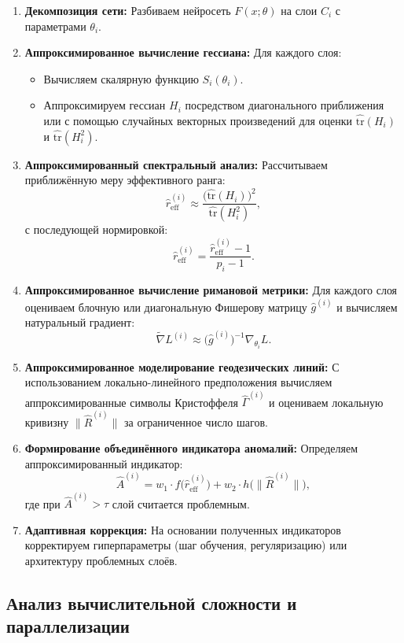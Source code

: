 \documentclass[a4paper,12pt]{article}
\begin{document}
\begin{enumerate}
    \item \textbf{Декомпозиция сети:} Разбиваем нейросеть \( F(x;\theta) \) на слои \( C_i \) с параметрами \(\theta_i\).
    \item \textbf{Аппроксимированное вычисление гессиана:} Для каждого слоя:
    \begin{itemize}
        \item Вычисляем скалярную функцию \( S_i(\theta_i) \).
        \item Аппроксимируем гессиан \( H_i \) посредством диагонального приближения или с помощью случайных векторных произведений для оценки \(\widehat{\text{tr}}(H_i)\) и \(\widehat{\text{tr}}(H_i^2)\).
    \end{itemize}
    \item \textbf{Аппроксимированный спектральный анализ:} Рассчитываем приближённую меру эффективного ранга:
    \[
    \widehat{r}_{\text{eff}}^{(i)} \approx \frac{\Big(\widehat{\text{tr}}(H_i)\Big)^2}{\widehat{\text{tr}}(H_i^2)},
    \]
    с последующей нормировкой:
    \[
    \hat{r}_{\text{eff}}^{(i)} = \frac{\widehat{r}_{\text{eff}}^{(i)} - 1}{p_i - 1}.
    \]
    \item \textbf{Аппроксимированное вычисление римановой метрики:} Для каждого слоя оцениваем блочную или диагональную Фишерову матрицу \( \hat{g}^{(i)} \) и вычисляем натуральный градиент:
    \[
    \tilde{\nabla} L^{(i)} \approx \big(\hat{g}^{(i)}\big)^{-1}\nabla_{\theta_i} L.
    \]
    \item \textbf{Аппроксимированное моделирование геодезических линий:} С использованием локально-линейного предположения вычисляем аппроксимированные символы Кристоффеля \(\hat{\Gamma}^{(i)}\) и оцениваем локальную кривизну \(\|\hat{R}^{(i)}\|\) за ограниченное число шагов.
    \item \textbf{Формирование объединённого индикатора аномалий:} Определяем аппроксимированный индикатор:
    \[
    \hat{A}^{(i)} = w_1 \cdot f\big(\hat{r}_{\text{eff}}^{(i)}\big) + w_2 \cdot h\big(\|\hat{R}^{(i)}\|\big),
    \]
    где при \( \hat{A}^{(i)} > \tau \) слой считается проблемным.
    \item \textbf{Адаптивная коррекция:} На основании полученных индикаторов корректируем гиперпараметры (шаг обучения, регуляризацию) или архитектуру проблемных слоёв.
\end{enumerate}

\subsection*{Анализ вычислительной сложности и параллелизации}
\end{document}
